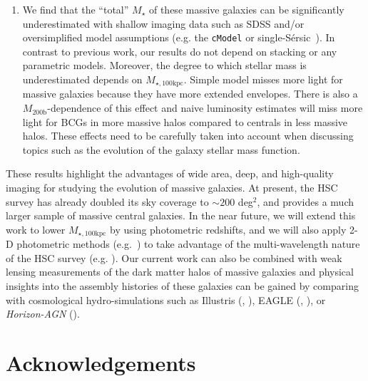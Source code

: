\documentclass[a4paper,fleqn,usenatbib]{mnras}
\def\ser{{S\'{e}rsic\ }}
\def\mstar{{$M_{\star}$}}
\def\mhalo{{$M_{\mathrm{200b}}$}}
\def\mtot{{$M_{\star,100\mathrm{kpc}}$}}
\begin{document}
\begin{enumerate}
        \item We find that the ``total'' \mstar{} of these massive galaxies can be 
            significantly underestimated with shallow imaging data such as SDSS and/or 
            oversimplified model assumptions (e.g. the \texttt{cModel} or single-\ser). 
            In contrast to previous work, our results do not depend on stacking or any 
            parametric models. 
            Moreover, the degree to which stellar mass is underestimated depends on 
            \mtot{}. 
            Simple model misses more light for massive galaxies because they have 
            more extended envelopes. 
            There is also a \mhalo{}-dependence of this effect and naive luminosity
            estimates will miss more light for BCGs in more massive halos compared 
            to centrals in less massive halos.
            These effects need to be carefully taken into account when discussing 
            topics such as the evolution of the galaxy stellar mass function.  
                        
    \end{enumerate}

    These results highlight the advantages of wide area, deep, and high-quality imaging 
    for studying the evolution of massive galaxies. 
    At present, the HSC survey has already doubled its sky coverage to 
    ${\sim} 200$ deg$^2$, and provides a much larger sample of massive central galaxies. 
    In the near future, we will extend this work to lower \mtot{} by using photometric 
    redshifts, and we will also apply 2-D photometric methods (e.g.\ \citealt{Huang2013a}) 
    to take advantage of the multi-wavelength nature of the HSC survey 
    (e.g. \citealt{Huang2016}). 
    Our current work can also be combined with weak lensing measurements of the dark 
    matter halos of massive galaxies and physical insights into the assembly histories 
    of these galaxies can be gained by comparing with cosmological hydro-simulations 
    such as Illustris (\citealt{Vogelsberger2014}, \citealt{Genel2014}), 
    EAGLE (\citealt{Schaye2015}, \citealt{Crain2015}), or \textit{Horizon-AGN} 
    (\citealt{Dubois2014}).

  
\section*{Acknowledgements}
\end{document}
